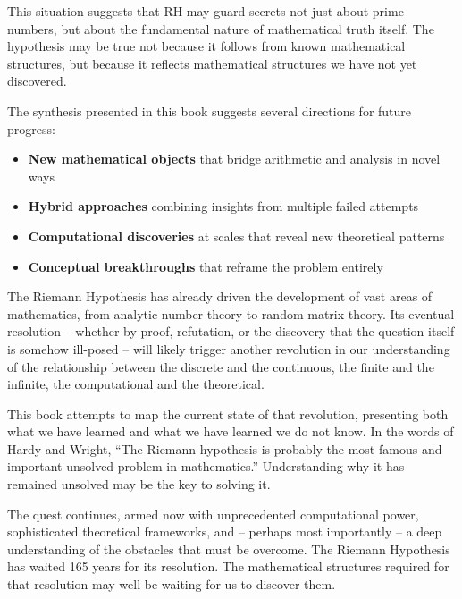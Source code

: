 This situation suggests that RH may guard secrets not just about prime numbers, but about the fundamental nature of mathematical truth itself. The hypothesis may be true not because it follows from known mathematical structures, but because it reflects mathematical structures we have not yet discovered.

The synthesis presented in this book suggests several directions for future progress:
\begin{itemize}
\item \textbf{New mathematical objects} that bridge arithmetic and analysis in novel ways
\item \textbf{Hybrid approaches} combining insights from multiple failed attempts
\item \textbf{Computational discoveries} at scales that reveal new theoretical patterns  
\item \textbf{Conceptual breakthroughs} that reframe the problem entirely
\end{itemize}

The Riemann Hypothesis has already driven the development of vast areas of mathematics, from analytic number theory to random matrix theory. Its eventual resolution -- whether by proof, refutation, or the discovery that the question itself is somehow ill-posed -- will likely trigger another revolution in our understanding of the relationship between the discrete and the continuous, the finite and the infinite, the computational and the theoretical.

This book attempts to map the current state of that revolution, presenting both what we have learned and what we have learned we do not know. In the words of Hardy and Wright, ``The Riemann hypothesis is probably the most famous and important unsolved problem in mathematics.'' Understanding why it has remained unsolved may be the key to solving it.

The quest continues, armed now with unprecedented computational power, sophisticated theoretical frameworks, and -- perhaps most importantly -- a deep understanding of the obstacles that must be overcome. The Riemann Hypothesis has waited 165 years for its resolution. The mathematical structures required for that resolution may well be waiting for us to discover them.